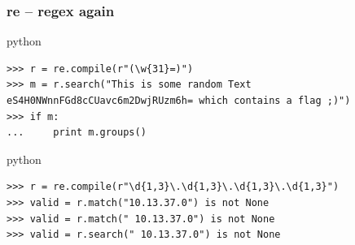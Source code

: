 \documentclass{beamer}
\begin{document}
\begin{frame}[fragile]
	\frametitle{re -- regex again}
	\begin{exampleblock}{python}
	\begin{lstlisting}
>>> r = re.compile(r"(\w{31}=)")
>>> m = r.search("This is some random Text eS4H0NWnnFGd8cCUavc6m2DwjRUzm6h= which contains a flag ;)")
>>> if m:
...     print m.groups()
	\end{lstlisting}
	\end{exampleblock}
\pause
	\begin{exampleblock}{python}
	\begin{lstlisting}
>>> r = re.compile(r"\d{1,3}\.\d{1,3}\.\d{1,3}\.\d{1,3}")
>>> valid = r.match("10.13.37.0") is not None
>>> valid = r.match(" 10.13.37.0") is not None
>>> valid = r.search(" 10.13.37.0") is not None
	\end{lstlisting}
	\end{exampleblock}
\end{frame}
\end{document}
